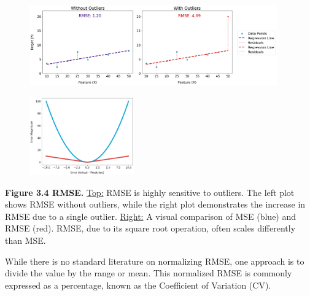 \clearpage

\thispagestyle{customstyle}

\begin{figure}[htbp]
    \centering
    \includegraphics[width=0.95\textwidth]{figures/RMSE_sensitivity_outliers_plot.png} %
\end{figure}

\begin{figure}
    \centering
    \vspace{-5pt} %
    \includegraphics[width=0.40\textwidth]{figures/RMSE_comparison_2d_plot.png} 
    \vspace{-10pt} 
\end{figure}

\noindent
\textbf{Figure 3.4 RMSE.} \underline{Top:} RMSE is highly sensitive to outliers. The left plot shows RMSE without outliers, while the right plot demonstrates the increase in RMSE due to a single outlier. 
\underline{Right:} A visual comparison of MSE (blue) and RMSE (red). RMSE, due to its square root operation, often scales differently than MSE.

\vspace{10pt} %

{While there is no standard literature on normalizing RMSE, one approach is to divide the value by the range or mean. 
This normalized RMSE is commonly expressed as a percentage, known as the Coefficient of Variation (CV).}

\vspace{10pt} %


